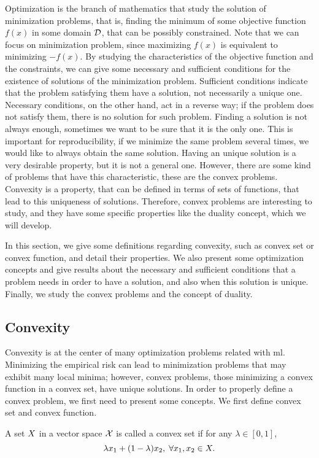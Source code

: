 %
Optimization is the branch of mathematics that study the solution of minimization problems, that is, finding the minimum of some objective function $f(x)$ in some domain $\mathcal{D}$, that can be possibly constrained. Note that we can focus on minimization problem, since maximizing $f(x)$ is equivalent to minimizing $-f(x)$.
%
By studying the characteristics of the objective function and the constraints, we can give some necessary and sufficient conditions for the existence of solutions of the minimization problem. Sufficient conditions indicate that the problem satisfying them have a solution, not necessarily a unique one. Necessary conditions, on the other hand, act in a reverse way; if the problem does not satisfy them, there is no solution for such problem.
% 
Finding a solution is not always enough, sometimes we want to be sure that it is the only one. This is important for reproducibility, if we minimize the same problem several times, we would like to always obtain the same solution.
%
Having an unique solution is a very desirable property, but it is not a general one. However, there are some kind of problems that have this characteristic, these are the convex problems. Convexity is a property, that can be defined in terms of sets of functions, that lead to this uniqueness of solutions.
%
Therefore, convex problems are interesting to study, and they have some specific properties like the duality concept, which we will develop.

%

In this section, we give some definitions regarding convexity, such as convex set or convex function, and detail their properties.
%
We also present some optimization concepts and give results about the necessary and sufficient conditions that a problem needs in order to have a solution, and also when this solution is unique.
%
Finally, we study the convex problems and the concept of duality.






\subsection{Convexity}
Convexity is at the center of many optimization problems related with \acrshort{ml}.
Minimizing the empirical risk can lead to minimization problems that may exhibit many local minima; however, convex problems, those minimizing a convex function in a convex set, have unique solutions.
In order to properly define a convex problem, we first need to present some concepts.  
We first define convex set and convex function.
\begin{definition}
    A set $X$ in a vector space $\mathcal{X}$ is called a convex set if for any $\lambda \in [0, 1]$,
    \begin{equation}
        \nonumber
        \lambda x_1 + (1 - \lambda) x_2 , \; \forall x_1, x_2 \in X .
    \end{equation}
\end{definition}

